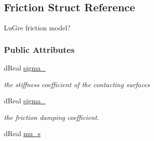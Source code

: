 \hypertarget{structOpenRAVE_1_1SensorBase_1_1TactileGeomData_1_1Friction}{
\subsection{Friction Struct Reference}
\label{structOpenRAVE_1_1SensorBase_1_1TactileGeomData_1_1Friction}
}


LuGre friction model?  


\subsubsection*{Public Attributes}
\begin{DoxyCompactItemize}
\item 
\hypertarget{structOpenRAVE_1_1SensorBase_1_1TactileGeomData_1_1Friction_a29fb8f4ad7a8bdfbe4e3948c0a32fbb9}{
dReal \hyperlink{structOpenRAVE_1_1SensorBase_1_1TactileGeomData_1_1Friction_a29fb8f4ad7a8bdfbe4e3948c0a32fbb9}{sigma\_}}
\label{structOpenRAVE_1_1SensorBase_1_1TactileGeomData_1_1Friction_a29fb8f4ad7a8bdfbe4e3948c0a32fbb9}

\begin{DoxyCompactList}\small\item\em the stiffness coefficient of the contacting surfaces \item\end{DoxyCompactList}\item 
\hypertarget{structOpenRAVE_1_1SensorBase_1_1TactileGeomData_1_1Friction_a8c17ee5f79ef8425657e59d742e8e125}{
dReal \hyperlink{structOpenRAVE_1_1SensorBase_1_1TactileGeomData_1_1Friction_a8c17ee5f79ef8425657e59d742e8e125}{sigma\_}}
\label{structOpenRAVE_1_1SensorBase_1_1TactileGeomData_1_1Friction_a8c17ee5f79ef8425657e59d742e8e125}

\begin{DoxyCompactList}\small\item\em the friction damping coefficient. \item\end{DoxyCompactList}\item 
\hypertarget{structOpenRAVE_1_1SensorBase_1_1TactileGeomData_1_1Friction_ad2a6883fb3ecdcb7f04dddd5fa23048f}{
dReal \hyperlink{structOpenRAVE_1_1SensorBase_1_1TactileGeomData_1_1Friction_ad2a6883fb3ecdcb7f04dddd5fa23048f}{mu\_\-s}}
\label{structOpenRAVE_1_1SensorBase_1_1TactileGeomData_1_1Friction_ad2a6883fb3ecdcb7f04dddd5fa23048f}


\end{DoxyCompactItemize}
